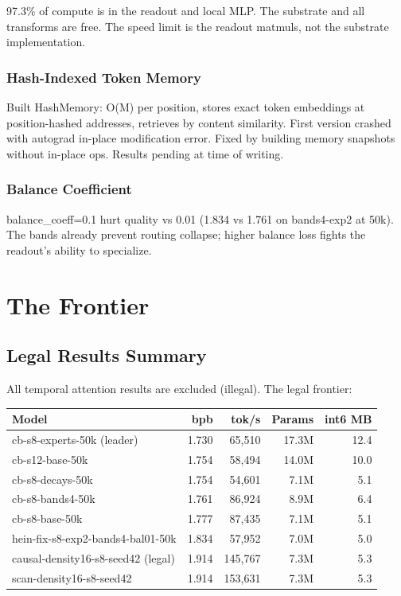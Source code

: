 \documentclass[11pt,a4paper]{report}
\begin{document}
97.3\% of compute is in the readout and local MLP. The substrate and all transforms are free. The speed limit is the readout matmuls, not the substrate implementation.

\section{Hash-Indexed Token Memory}

Built HashMemory: O(M) per position, stores exact token embeddings at position-hashed addresses, retrieves by content similarity. First version crashed with autograd in-place modification error. Fixed by building memory snapshots without in-place ops. Results pending at time of writing.

\section{Balance Coefficient}

balance\_coeff=0.1 hurt quality vs 0.01 (1.834 vs 1.761 on bands4-exp2 at 50k). The bands already prevent routing collapse; higher balance loss fights the readout's ability to specialize.


\part{The Frontier}

\chapter{Legal Results Summary}

All temporal attention results are excluded (illegal). The legal frontier:

\begin{table}[h]
\centering
\begin{tabular}{lrrrr}
\toprule
\textbf{Model} & \textbf{bpb} & \textbf{tok/s} & \textbf{Params} & \textbf{int6 MB} \\
\midrule
cb-s8-experts-50k (leader) & 1.730 & 65,510 & 17.3M & 12.4 \\
cb-s12-base-50k & 1.754 & 58,494 & 14.0M & 10.0 \\
cb-s8-decays-50k & 1.754 & 54,601 & 7.1M & 5.1 \\
cb-s8-bands4-50k & 1.761 & 86,924 & 8.9M & 6.4 \\
cb-s8-base-50k & 1.777 & 87,435 & 7.1M & 5.1 \\
hein-fix-s8-exp2-bands4-bal01-50k & 1.834 & 57,952 & 7.0M & 5.0 \\
causal-density16-s8-seed42 (legal) & 1.914 & 145,767 & 7.3M & 5.3 \\
scan-density16-s8-seed42 & 1.914 & 153,631 & 7.3M & 5.3 \\
\bottomrule
\end{tabular}
\end{table}
\end{document}
